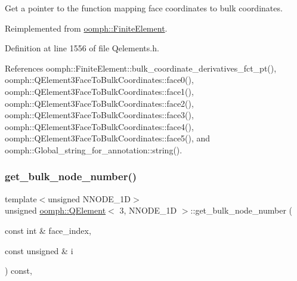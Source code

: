 Get a pointer to the function mapping face coordinates to bulk coordinates. 



Reimplemented from \hyperlink{classoomph_1_1FiniteElement_af20f05fb162a90b7d8ae175ec5dfab1a}{oomph\+::\+Finite\+Element}.



Definition at line 1556 of file Qelements.\+h.



References oomph\+::\+Finite\+Element\+::bulk\+\_\+coordinate\+\_\+derivatives\+\_\+fct\+\_\+pt(), oomph\+::\+Q\+Element3\+Face\+To\+Bulk\+Coordinates\+::face0(), oomph\+::\+Q\+Element3\+Face\+To\+Bulk\+Coordinates\+::face1(), oomph\+::\+Q\+Element3\+Face\+To\+Bulk\+Coordinates\+::face2(), oomph\+::\+Q\+Element3\+Face\+To\+Bulk\+Coordinates\+::face3(), oomph\+::\+Q\+Element3\+Face\+To\+Bulk\+Coordinates\+::face4(), oomph\+::\+Q\+Element3\+Face\+To\+Bulk\+Coordinates\+::face5(), and oomph\+::\+Global\+\_\+string\+\_\+for\+\_\+annotation\+::string().

\mbox{\label{classoomph_1_1QElement_3_013_00_01NNODE__1D_01_4_a8ce678f07f62aea2f676737374758820}} 
\subsubsection{\texorpdfstring{get\+\_\+bulk\+\_\+node\+\_\+number()}{get\_bulk\_node\_number()}}
{\footnotesize\ttfamily template$<$unsigned N\+N\+O\+D\+E\+\_\+1D$>$ \\
unsigned \hyperlink{classoomph_1_1QElement}{oomph\+::\+Q\+Element}$<$ 3, N\+N\+O\+D\+E\+\_\+1D $>$\+::get\+\_\+bulk\+\_\+node\+\_\+number (\begin{DoxyParamCaption}\item[{const int \&}]{face\+\_\+index,  }\item[{const unsigned \&}]{i }\end{DoxyParamCaption}) const\hspace{0.3cm}{\ttfamily [inline]}, {\ttfamily [virtual]}}

